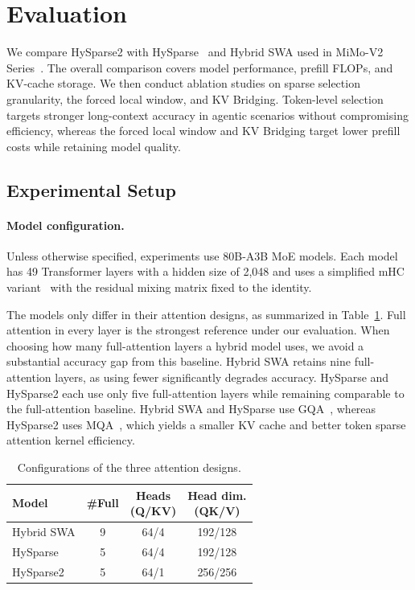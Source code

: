 \section{Evaluation}

We compare HySparse2 with HySparse~\citep{hysparse} and Hybrid SWA used in MiMo-V2 Series~\citep{xiao2026mimo}.
The overall comparison covers model performance, prefill FLOPs, and KV-cache storage.
We then conduct ablation studies on sparse selection granularity, the forced local window, and KV Bridging. 
Token-level selection targets stronger long-context accuracy in agentic scenarios without compromising efficiency, whereas the forced local window and KV Bridging target lower prefill costs while retaining model quality.

\subsection{Experimental Setup}
\label{sec:eval-setup}

\paragraph{Model configuration.}
Unless otherwise specified, experiments use 80B-A3B MoE models.
Each model has 49 Transformer layers with a hidden size of 2,048 and uses a simplified mHC variant~\citep{zhu2025hyperconnections,xie2026mhc} with the residual mixing matrix fixed to the identity. 

The models only differ in their attention designs, as summarized in Table~\ref{tab:eval-model-config}.
Full attention in every layer is the strongest reference under our evaluation. When choosing how many full-attention layers a hybrid model uses, we avoid a substantial accuracy gap from this baseline. Hybrid SWA retains nine full-attention layers, as using fewer significantly degrades accuracy. HySparse and HySparse2 each use only five full-attention layers while remaining comparable to the full-attention baseline.
Hybrid SWA and HySparse use GQA~\citep{gqa}, whereas HySparse2 uses MQA~\citep{mqa}, which yields a smaller KV cache and better token sparse attention kernel efficiency.

\begin{table}[H]
    \centering
    \small
    \setlength{\tabcolsep}{10pt}
    \begin{tabular}{lccc}
        \toprule
        \textbf{Model} & \textbf{\#Full} & \makecell{\textbf{Heads}\\\textbf{(Q/KV)}} & \makecell{\textbf{Head dim.}\\\textbf{(QK/V)}} \\
        \midrule
        Hybrid SWA & 9 & 64/4 & 192/128 \\
        HySparse & 5 & 64/4 & 192/128 \\
        HySparse2 & 5 & 64/1 & 256/256 \\
        \bottomrule
    \end{tabular}
    \caption{Configurations of the three attention designs.}
    \label{tab:eval-model-config}
\end{table}

